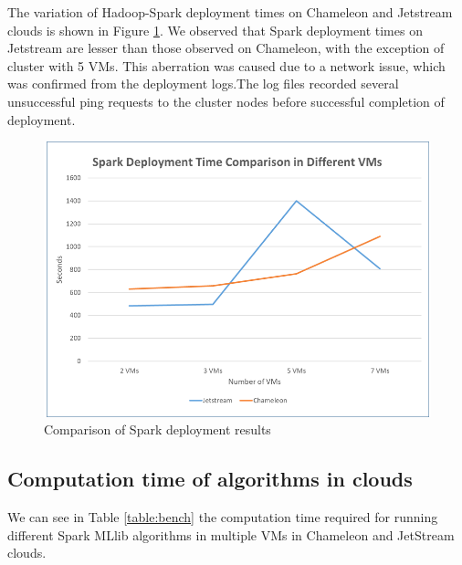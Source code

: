 \documentclass[9pt,twocolumn,twoside]{../../styles/osajnl}
\begin{document}
The variation of Hadoop-Spark deployment times on Chameleon and Jetstream clouds is shown in Figure \ref{fig:spd}. We observed that Spark deployment times on Jetstream are lesser than those observed on Chameleon, with the exception of cluster with 5 VMs.
This aberration was caused due to a network issue, which was confirmed from the deployment logs.The log files recorded several unsuccessful ping requests to the cluster nodes before successful completion of deployment.

\begin{figure}[h!]
	\centering
	\includegraphics[width=\linewidth,scale=1]{images/finalspdeployment.png}
	\caption{Comparison of Spark deployment results}
	\label{fig:spd}
\end{figure}

\subsection{Computation time of algorithms in clouds}

We can see in Table \ref{table:bench} the computation time required for running different Spark MLlib algorithms in multiple VMs in Chameleon and JetStream clouds.
\end{document}
